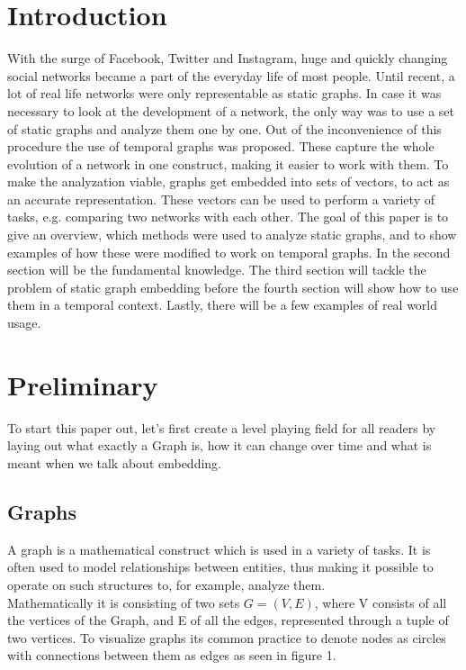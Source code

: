 \documentclass[sigconf]{acmart}
\begin{document}
\section{Introduction}
With the surge of Facebook, Twitter and Instagram, huge and quickly changing social networks became a part of the everyday life of most people.
Until recent, a lot of real life networks were only representable as static graphs. In case it was necessary to look at the development of a network, the only way was to use a set of static graphs and analyze them one by one.
Out of the inconvenience of this procedure the use of temporal graphs was proposed. These capture the whole evolution of a network in one construct, making it easier to work with them.
To make the analyzation viable, graphs get embedded into sets of vectors, to act as an accurate representation. 
These vectors can be used to perform a variety of tasks, e.g. comparing two networks with each other.
The goal of this paper is to give an overview, which methods were used to analyze static graphs, and to show examples of how these were modified to work on 
temporal graphs.
In the second section will be the fundamental knowledge. The third section will tackle the problem of static graph embedding before the fourth section will show how to
use them in a temporal context. Lastly, there will be a few examples of real world usage. 


\section{Preliminary}
To start this paper out, let's first create a level playing field for all readers by laying out what exactly a Graph is, 
how it can change over time and what is meant when we talk about embedding.



\subsection{Graphs}
A graph is a mathematical construct which is used in a variety of tasks. It is often used to model relationships between 
entities, thus making it possible to operate on such structures to, for example, analyze them.\\
Mathematically it is consisting of two sets \(G = (V, E)\), where V consists of all the vertices of the Graph, and E of all the edges, represented through a tuple of two vertices.
To visualize graphs its common practice to denote nodes as circles with connections between them as edges as seen in figure 1.
\end{document}
